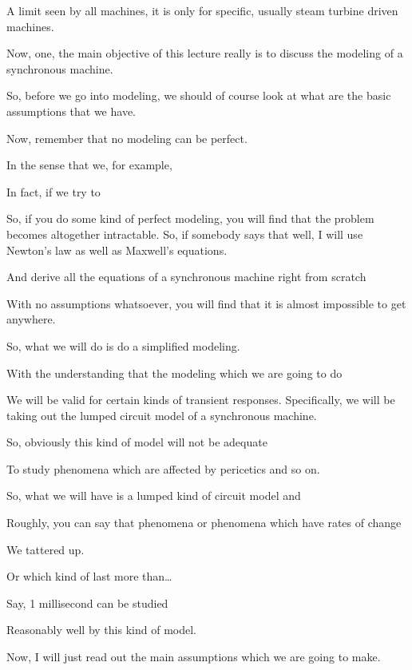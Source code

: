 \documentclass{article}
\begin{document}
A limit seen by all machines, it is only for specific, usually steam turbine driven machines.

Now, one, the main objective of this lecture really is to discuss the modeling of a synchronous machine.

So, before we go into modeling, we should of course look at what are the basic assumptions that we have.

Now, remember that no modeling can be perfect.

In the sense that we, for example,

In fact, if we try to

So, if you do some kind of perfect modeling, you will find that the problem becomes altogether intractable. So, if somebody says that well, I will use Newton's law as well as Maxwell's equations.

And derive all the equations of a synchronous machine right from scratch

With no assumptions whatsoever, you will find that it is almost impossible to get anywhere.

So, what we will do is do a simplified modeling.

With the understanding that the modeling which we are going to do

We will be valid for certain kinds of transient responses. Specifically, we will be taking out the lumped circuit model of a synchronous machine.

So, obviously this kind of model will not be adequate

To study phenomena which are affected by pericetics and so on.

So, what we will have is a lumped kind of circuit model and

Roughly, you can say that phenomena or phenomena which have rates of change

We tattered up.

Or which kind of last more than…

Say, 1 millisecond can be studied

Reasonably well by this kind of model.

Now, I will just read out the main assumptions which we are going to make.
\end{document}
